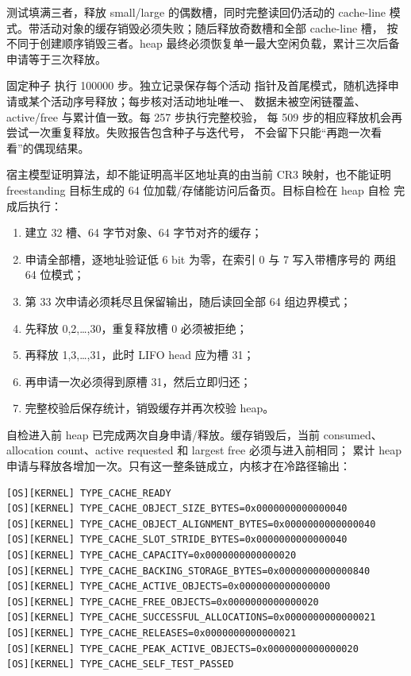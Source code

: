 测试填满三者，释放 small/large 的偶数槽，同时完整读回仍活动的 cache-line
模式。带活动对象的缓存销毁必须失败；随后释放奇数槽和全部 cache-line 槽，
按不同于创建顺序销毁三者。heap 最终必须恢复单一最大空闲负载，累计三次后备
申请等于三次释放。

固定种子  执行 100000 步。独立记录保存每个活动
指针及首尾模式，随机选择申请或某个活动序号释放；每步核对活动地址唯一、
数据未被空闲链覆盖、active/free 与累计值一致。每 257 步执行完整校验，
每 509 步的相应释放机会再尝试一次重复释放。失败报告包含种子与迭代号，
不会留下只能“再跑一次看看”的偶现结果。

宿主模型证明算法，却不能证明高半区地址真的由当前 CR3 映射，也不能证明
freestanding 目标生成的 64 位加载/存储能访问后备页。目标自检在 heap 自检
完成后执行：

\begin{enumerate}[label=\arabic*.]
  \item 建立 32 槽、64 字节对象、64 字节对齐的缓存；
  \item 申请全部槽，逐地址验证低 6 bit 为零，在索引 0 与 7 写入带槽序号的
        两组 64 位模式；
  \item 第 33 次申请必须耗尽且保留输出，随后读回全部 64 组边界模式；
  \item 先释放 0,2,\ldots,30，重复释放槽 0 必须被拒绝；
  \item 再释放 1,3,\ldots,31，此时 LIFO head 应为槽 31；
  \item 再申请一次必须得到原槽 31，然后立即归还；
  \item 完整校验后保存统计，销毁缓存并再次校验 heap。
\end{enumerate}

自检进入前 heap 已完成两次自身申请/释放。缓存销毁后，当前 consumed、
allocation count、active requested 和 largest free 必须与进入前相同；
累计 heap 申请与释放各增加一次。只有这一整条链成立，内核才在冷路径输出：

\begin{verbatim}
[OS][KERNEL] TYPE_CACHE_READY
[OS][KERNEL] TYPE_CACHE_OBJECT_SIZE_BYTES=0x0000000000000040
[OS][KERNEL] TYPE_CACHE_OBJECT_ALIGNMENT_BYTES=0x0000000000000040
[OS][KERNEL] TYPE_CACHE_SLOT_STRIDE_BYTES=0x0000000000000040
[OS][KERNEL] TYPE_CACHE_CAPACITY=0x0000000000000020
[OS][KERNEL] TYPE_CACHE_BACKING_STORAGE_BYTES=0x0000000000000840
[OS][KERNEL] TYPE_CACHE_ACTIVE_OBJECTS=0x0000000000000000
[OS][KERNEL] TYPE_CACHE_FREE_OBJECTS=0x0000000000000020
[OS][KERNEL] TYPE_CACHE_SUCCESSFUL_ALLOCATIONS=0x0000000000000021
[OS][KERNEL] TYPE_CACHE_RELEASES=0x0000000000000021
[OS][KERNEL] TYPE_CACHE_PEAK_ACTIVE_OBJECTS=0x0000000000000020
[OS][KERNEL] TYPE_CACHE_SELF_TEST_PASSED
\end{verbatim}

